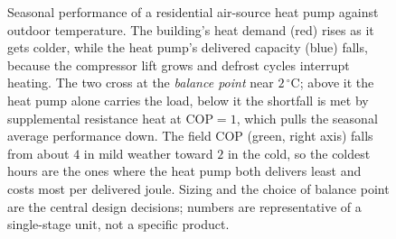 \begin{figure}[htbp]
\caption[Air-source heat-pump seasonal balance]{Seasonal performance of a
residential air-source heat pump against outdoor temperature. The building's
heat demand (red) rises as it gets colder, while the heat pump's delivered
capacity (blue) falls, because the compressor lift grows and defrost cycles
interrupt heating. The two cross at the \emph{balance point} near
$2\,^{\circ}$C; above it the heat pump alone carries the load, below it the
shortfall is met by supplemental resistance heat at $\text{COP}=1$, which
pulls the seasonal average performance down. The field COP (green, right axis)
falls from about $4$ in mild weather toward $2$ in the cold, so the coldest
hours are the ones where the heat pump both delivers least and costs most per
delivered joule. Sizing and the choice of balance point are the central design
decisions; numbers are representative of a single-stage unit, not a specific
product.}
\label{fig:vol04ch03:heat-pump-balance}
\end{figure}
